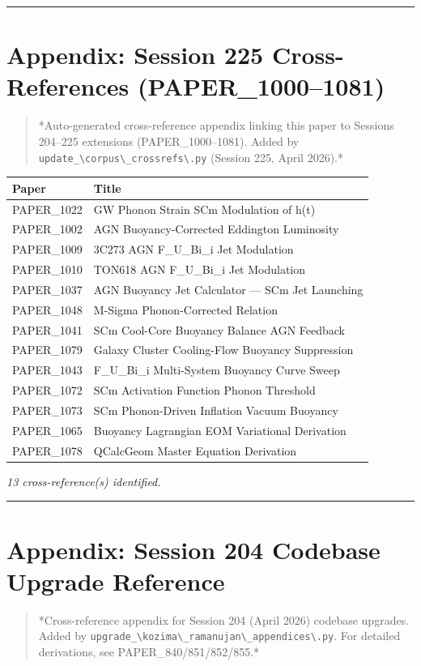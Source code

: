 \documentclass[12pt,a4paper]{article}
\begin{document}
\medskip\hrule\medskip

\section{Appendix: Session 225 Cross-References (PAPER\_1000--1081)}

\begin{quote}
*Auto-generated cross-reference appendix linking this paper to
Sessions 204--225 extensions (PAPER\_1000--1081). Added by
\texttt{update\_\textbackslash {corpus\textbackslash \_crossrefs\textbackslash }.py} (Session 225, April 2026).*
\end{quote}

\begin{table}[H]
\centering
\small
\begin{tabularx}{\linewidth}{@{}>{\raggedright\arraybackslash}X>{\raggedright\arraybackslash}X@{}}
\toprule
Paper & Title \tabularnewline
\midrule
PAPER\_1022 & GW Phonon Strain SCm Modulation of h(t) \tabularnewline
PAPER\_1002 & AGN Buoyancy-Corrected Eddington Luminosity \tabularnewline
PAPER\_1009 & 3C273 AGN F\_{U\_Bi\_i} Jet Modulation \tabularnewline
PAPER\_1010 & TON618 AGN F\_{U\_Bi\_i} Jet Modulation \tabularnewline
PAPER\_1037 & AGN Buoyancy Jet Calculator --- SCm Jet Launching \tabularnewline
PAPER\_1048 & M-Sigma Phonon-Corrected Relation \tabularnewline
PAPER\_1041 & SCm Cool-Core Buoyancy Balance AGN Feedback \tabularnewline
PAPER\_1079 & Galaxy Cluster Cooling-Flow Buoyancy Suppression \tabularnewline
PAPER\_1043 & F\_{U\_Bi\_i} Multi-System Buoyancy Curve Sweep \tabularnewline
PAPER\_1072 & SCm Activation Function Phonon Threshold \tabularnewline
PAPER\_1073 & SCm Phonon-Driven Inflation Vacuum Buoyancy \tabularnewline
PAPER\_1065 & Buoyancy Lagrangian EOM Variational Derivation \tabularnewline
PAPER\_1078 & QCalcGeom Master Equation Derivation \tabularnewline
\bottomrule
\end{tabularx}
\end{table}

\emph{13 cross-reference(s) identified.}

\medskip\hrule\medskip

\section{Appendix: Session 204 Codebase Upgrade Reference}

\begin{quote}
*Cross-reference appendix for Session 204 (April 2026) codebase upgrades.
Added by \texttt{upgrade\_\textbackslash {kozima\textbackslash \_ramanujan\textbackslash \_appendices\textbackslash }.py}. For detailed derivations,
see PAPER\_840/851/852/855.*
\end{quote}
\end{document}
